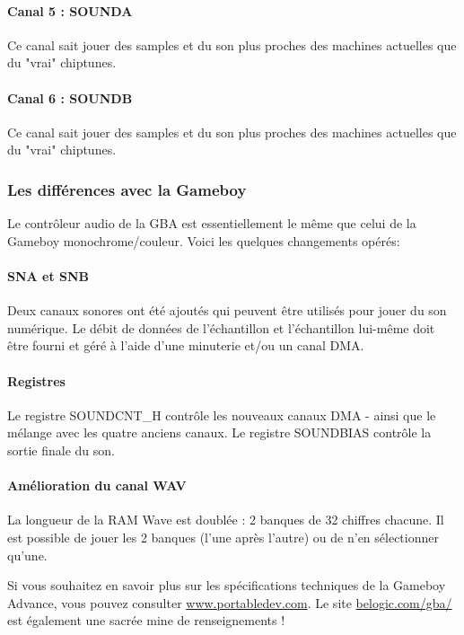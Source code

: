 
\paragraph{Canal 5 : SOUNDA} Ce canal sait jouer des samples et du son plus proches des machines actuelles que du "vrai" chiptunes.

\paragraph{Canal 6 : SOUNDB} Ce canal sait jouer des samples et du son plus proches des machines actuelles que du "vrai" chiptunes.


\subsubsection{Les différences avec la Gameboy}

Le contrôleur audio de la GBA est essentiellement le même que celui de la Gameboy monochrome/couleur.
Voici les quelques changements opérés:

\paragraph{SNA et SNB} Deux canaux sonores ont été ajoutés qui peuvent être utilisés pour jouer du son numérique.
                      Le débit de données de l'échantillon et l'échantillon lui-même doit être fourni et géré à l'aide d'une minuterie et/ou un canal DMA.

\paragraph{Registres} Le registre SOUNDCNT\_H contrôle les nouveaux canaux DMA - ainsi que le mélange avec les quatre anciens canaux.
                      Le registre SOUNDBIAS contrôle la sortie finale du son.

\paragraph{Amélioration du canal WAV} La longueur de la RAM Wave est doublée : 2 banques de 32 chiffres chacune.
                      Il est possible de jouer les 2 banques (l'une après l'autre) ou de n'en sélectionner qu'une.

\medskip
Si vous souhaitez en savoir plus sur les spécifications techniques de la Gameboy Advance,
vous pouvez consulter \href{http://www.portabledev.com/media/GBA/tutoriels/gbatek.htm}{www.portabledev.com}.
Le site \href{http://belogic.com/gba/}{belogic.com/gba/} est également une sacrée mine de renseignements !
